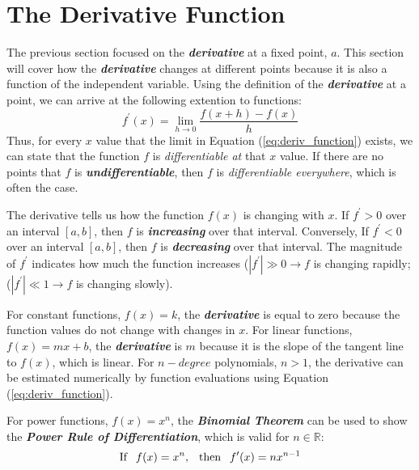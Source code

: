 \section{The Derivative Function}
The previous section focused on the \textbf{\textit{derivative}} at a fixed point, $a$. This section will cover how the \textbf{\textit{derivative}} changes at different points because it is also a function of the independent variable. Using the definition of the \textbf{\textit{derivative}} at a point, we can arrive at the following extention to functions:
\begin{equation}
\label{eq:deriv_function}
f^\prime(x) = \lim_{h \rightarrow 0} \frac{f(x+h) - f(x)}{h}
\end{equation}
Thus, for every $x$ value that the limit in Equation (\ref{eq:deriv_function}) exists, we can state that the function $f$ is \textit{differentiable at} that $x$ value. If there are no points that $f$ is \textbf{\textit{undifferentiable}}, then $f$ is \textit{differentiable everywhere}, which is often the case.

\vspace{0.1in}
The derivative tells us how the function $f(x)$ is changing with $x$. If $f^\prime > 0$ over an interval $[a, b]$, then $f$ is \textbf{\textit{increasing}} over that interval. Conversely,  If $f^\prime < 0$ over an interval $[a, b]$, then $f$ is \textbf{\textit{decreasing}} over that interval. The magnitude of $f^\prime$ indicates how much the function increases ($|f^\prime| \gg 0 \rightarrow f$ is changing rapidly; ($|f^\prime| \ll 1 \rightarrow f$ is changing slowly).

\vspace{0.1in}
For constant functions, $f(x) = k$, the \textbf{\textit{derivative}} is equal to zero because the function values do not change with changes in $x$. For linear functions, $f(x) = mx + b$, the \textbf{\textit{derivative}} is $m$ because it is the slope of the tangent line to $f(x)$, which is linear. For $n-degree$ polynomials, $n > 1$, the derivative can be estimated numerically by function evaluations using Equation (\ref{eq:deriv_function}).

\vspace{0.1in}
For power functions, $f(x) = x^n$, the \textbf{\textit{Binomial Theorem}} can be used to show the \textbf{\textit{Power Rule of Differentiation}}, which is valid for $n \in \mathbb{R}$:
\begin{equation}
\text{If} \hphantom{-} f(x) = x^n, \hphantom{-} \text{then} \hphantom{-} f^\prime(x) = n x^{n-1}
\end{equation}


